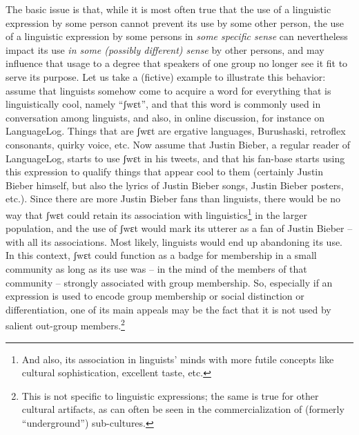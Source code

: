 \documentclass[output=paper,hidelinks]{langscibook}
\begin{document}
The basic issue is that, while it is most often true that the use of a linguistic expression by some person cannot prevent its use by some other person, the use of a linguistic expression by some persons in \emph{some specific sense} can nevertheless impact its use \emph{in some (possibly different) sense} by other persons, and may influence that usage to a degree that speakers of one group no longer see it fit to serve its purpose. Let us take a (fictive) example to illustrate this behavior: assume that linguists somehow come to acquire a word for everything that is linguistically cool, namely ``ʃwɛt'', and that this word is commonly used in  conversation among linguists, and also, in online discussion, for instance on LanguageLog. Things that are ʃwɛt are ergative languages, Burushaski, retroflex consonants, quirky voice, etc. Now assume that Justin Bieber, a regular reader of LanguageLog, starts to use ʃwɛt in his tweets, and that his fan-base starts using this expression to qualify things that appear cool to them (certainly Justin Bieber himself, but also the lyrics of Justin Bieber songs, Justin Bieber posters, etc.). Since there are more Justin Bieber fans than linguists, there would be no way that ʃwɛt could retain its association with linguistics\footnote{And also, its association in linguists' minds with more futile concepts like cultural sophistication, excellent taste, etc.} in the larger population, and the use of ʃwɛt would mark its utterer as a fan of Justin Bieber -- with all its associations. Most likely, linguists would end up abandoning its use. In this context, ʃwɛt could function as a badge for membership in a small community as long as its use was -- in the mind of the members of that community -- strongly associated with group membership. So, especially if an expression is used to encode group membership or social distinction or differentiation, one of its main appeals may be the fact that it is not used by salient out-group members.\footnote{This is not specific to linguistic expressions; the same is true for other cultural artifacts, as can often be seen in the commercialization of (formerly ``underground'') sub-cultures.} 
\end{document}
